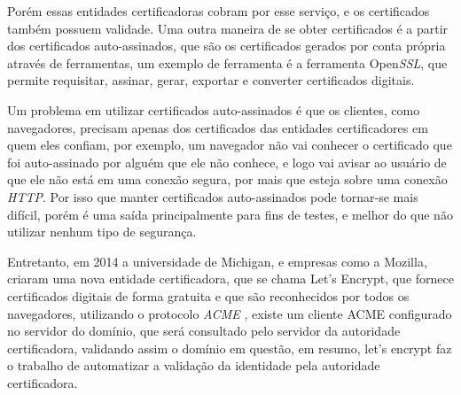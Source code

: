 Porém essas entidades certificadoras cobram por esse serviço, e os certificados também
possuem validade. Uma outra maneira de se obter certificados é a partir dos certificados
auto-assinados, que são os certificados gerados por conta própria através de
ferramentas, um exemplo de ferramenta é a ferramenta Open\textit{SSL}, que permite requisitar,
assinar, gerar, exportar e converter certificados digitais.

Um problema em utilizar certificados auto-assinados é que os clientes, como navegadores,
precisam apenas dos certificados das entidades certificadores em quem eles confiam, por
exemplo, um navegador não vai conhecer o certificado que foi auto-assinado por
alguém que ele não conhece, e logo vai avisar ao usuário de que ele não está em uma
conexão segura, por mais que esteja sobre uma conexão \textit{HTTP}. Por isso que manter certificados
auto-assinados pode tornar-se mais difícil, porém é uma saída principalmente para
fins de testes, e melhor do que não utilizar nenhum tipo de segurança.

Entretanto, em 2014 a universidade de Michigan, e empresas como a Mozilla, criaram
uma nova entidade certificadora, que se chama Let's Encrypt, que fornece certificados
digitais de forma gratuita e que são reconhecidos por todos os navegadores,
utilizando o protocolo \textit{ACME}  \cite{ACME}, existe um cliente ACME configurado no
servidor do domínio, que será
consultado pelo servidor da autoridade certificadora, validando assim o domínio
em questão, em resumo, let's encrypt faz o trabalho de automatizar a validação da identidade 
pela autoridade certificadora.
